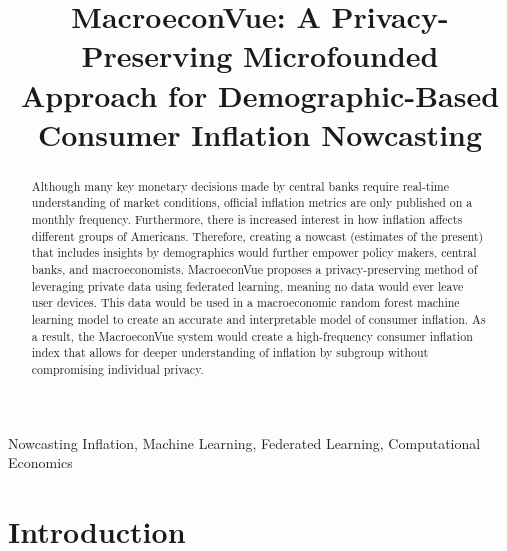 \documentclass[conference]{IEEEtran}
\begin{document}
\title{MacroeconVue: A Privacy-Preserving Microfounded Approach for Demographic-Based Consumer Inflation Nowcasting}

\author{
    \and
}


\maketitle

\begin{abstract}
Although many key monetary decisions made by central banks require real-time understanding of market conditions, official inflation metrics are only published on a monthly frequency. Furthermore, there is increased interest in how inflation affects different groups of Americans. Therefore, creating a nowcast (estimates of the present) that includes insights by demographics would further empower policy makers, central banks, and macroeconomists. MacroeconVue proposes a privacy-preserving method of leveraging private data using federated learning, meaning no data would ever leave user devices. This data would be used in a macroeconomic random forest machine learning model to create an accurate and interpretable model of consumer inflation. As a result, the MacroeconVue system would create a high-frequency consumer inflation index that allows for deeper understanding of inflation by subgroup without compromising individual privacy. 
\end{abstract}

\begin{IEEEkeywords}
Nowcasting Inflation, Machine Learning, Federated Learning, Computational Economics
\end{IEEEkeywords}

\section{Introduction}
\end{document}
